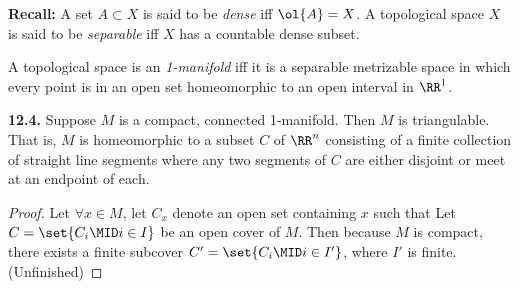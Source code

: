 \documentclass{fkbook}
\newenvironment{problem}[1][Problem \thesection.]
{\noindent\begin{boxedminipage}{\linewidth}\textbf{#1.}}
{\end{boxedminipage}}
\newenvironment{recall}
{\noindent\begin{center}\begin{boxedminipage}{.95\linewidth}\textbf{Recall:}}
{\end{boxedminipage}\end{center}}
\begin{document}
\begin{recall}
  A set $A \subset X$ is said to be \emph{dense} iff $\ol{A} = X$. A topological
  space $X$ is said to be \emph{separable} iff $X$ has a countable dense subset.
\end{recall}

\begin{definition}[1-manifold]
  A topological space is an \emph{1-manifold} iff it is a separable metrizable
  space in which every point is in an open set homeomorphic to an open interval
  in $\RR^1$.
\end{definition}
\begin{problem}[12.4]
  Suppose $M$ is a compact, connected 1-manifold. Then $M$ is triangulable. That
  is, $M$ is homeomorphic to a subset $C$ of $\RR^n$ consisting of a finite
  collection of straight line segments where any two segments of $C$ are either
  disjoint or meet at an endpoint of each.
\end{problem}
\begin{proof}
  Let $\forall x \in M$, let $C_x$ denote an open set containing $x$ such that
  Let $C = \set{C_i \MID i \in I}$ be an open cover of $M$. Then because $M$ is
  compact, there exists a finite subcover $C' = \set{C_i \MID i \in I'}$, where
  $I'$ is finite. (Unfinished)
\end{proof}
\end{document}
